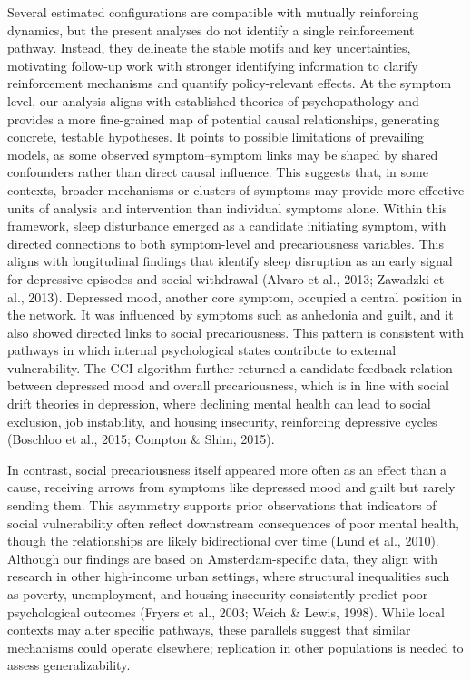 \documentclass[
]{article}
\begin{document}
\textcolor{BrickRed}{Several estimated configurations are compatible with mutually reinforcing dynamics, but the present analyses do not identify a single reinforcement pathway. Instead, they delineate the stable motifs and key uncertainties, motivating follow-up work with stronger identifying information to clarify reinforcement mechanisms and quantify policy-relevant effects.}
At the symptom level, our analysis aligns with established theories of
psychopathology and provides a more fine-grained map of potential causal
relationships, generating concrete, testable hypotheses. It points to
possible limitations of prevailing models, as some observed
symptom--symptom links may be shaped by shared confounders rather than
direct causal influence. This suggests that, in some contexts, broader
mechanisms or clusters of symptoms may provide more effective units of
analysis and intervention than individual symptoms alone.
\textcolor{BrickRed}{Within this framework, sleep disturbance emerged as a candidate initiating symptom, with directed connections to both symptom-level and precariousness variables. This aligns with longitudinal findings that identify sleep disruption as an early signal for depressive episodes and social withdrawal}
(Alvaro et al., 2013; Zawadzki et al., 2013). Depressed mood, another
core symptom, occupied a central position in the network.
\textcolor{BrickRed}{It was influenced by symptoms such as anhedonia and guilt, and it also showed directed links to social precariousness. This pattern is consistent with pathways in which internal psychological states contribute to external vulnerability. The CCI algorithm further returned a candidate feedback relation between depressed mood and overall precariousness, which is in line with social drift theories in depression, where declining mental health can lead to social exclusion, job instability, and housing insecurity, reinforcing depressive cycles}
(Boschloo et al., 2015; Compton \& Shim, 2015).

In contrast, social precariousness itself appeared more often as an
effect than a cause, receiving arrows from symptoms like depressed mood
and guilt but rarely sending them. This asymmetry supports prior
observations that indicators of social vulnerability often reflect
downstream consequences of poor mental health, though the relationships
are likely bidirectional over time (Lund et al., 2010). Although our
findings are based on Amsterdam-specific data, they align with research
in other high-income urban settings, where structural inequalities such
as poverty, unemployment, and housing insecurity consistently predict
poor psychological outcomes (Fryers et al., 2003; Weich \& Lewis, 1998).
\textcolor{BrickRed}{While local contexts may alter specific pathways, these parallels suggest that similar mechanisms could operate elsewhere; replication in other populations is needed to assess generalizability.}
\end{document}
